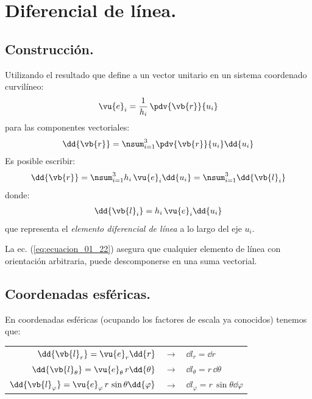 \section{Diferencial de línea.}

\subsection{Construcción.}

Utilizando el resultado que define a un vector unitario en un sistema coordenado curvilíneo:
\begin{align*}
\vu{e}_{i} = \dfrac{1}{h_{i}} \, \pdv{\vb{r}}{u_{i}}
\end{align*}
para las componentes vectoriales:
\begin{align*}
\dd{\vb{r}} = \nsum_{i=1}^{3} \pdv{\vb{r}}{u_{i}} \dd{u_{i}}
\end{align*}
Es posible escribir:
\begin{align}
\dd{\vb{r}} = \nsum_{i=1}^{3} h_{i} \, \vu{e}_{i} \dd{u_{i}} = \nsum_{i=1}^{3} \dd{\vb{l}_{i}}
\label{eq:ecuacion_01_21}
\end{align}
donde:
\begin{align}
\dd{\vb{l}_{i}} = h_{i} \, \vu{e}_{i} \dd{u_{i}}
\label{eq:ecuacion_01_22}
\end{align}
que representa el \emph{elemento diferencial de línea} a lo largo del eje $u_{i}$.
\par
La ec. (\ref{eq:ecuacion_01_22}) asegura que cualquier elemento de línea con orientación arbitraria, puede descomponerse en una suma vectorial.

\subsection{Coordenadas esféricas.}

En coordenadas esféricas (ocupando los factores de escala ya conocidos) tenemos que:
\begin{table}[H]
\centering
\fontsize{14}{14}\selectfont
\begin{tabular}{r  c  l}
$\dd{\vb{l}_{r}} = \vu{e}_{r} \dd{r}$ & $\longrightarrow$ & $\dd{l_{r}} = \dd{r}$ \\
$\dd{\vb{l}_{\theta}} = \vu{e}_{\theta} \, r \dd{\theta}$ & $\longrightarrow$ & $\dd{l_{\theta}} = r \, \dd{\theta}$ \\
$\dd{\vb{l}_{\varphi}} = \vu{e}_{\varphi} \, r \, \sin \theta \dd{\varphi}$ & $\longrightarrow$ & $\dd{l_{\varphi}} = r \, \sin \theta \dd{\varphi}$ \\
\end{tabular}
\end{table}

